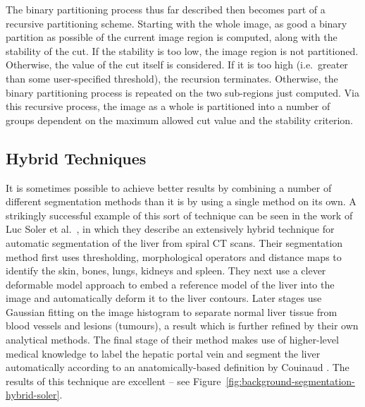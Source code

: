 The binary partitioning process thus far described then becomes part of a recursive partitioning scheme. Starting with the whole image, as good a binary partition as possible of the current image region is computed, along with the stability of the cut. If the stability is too low, the image region is not partitioned. Otherwise, the value of the cut itself is considered. If it is too high (i.e.~greater than some user-specified threshold), the recursion terminates. Otherwise, the binary partitioning process is repeated on the two sub-regions just computed. Via this recursive process, the image as a whole is partitioned into a number of groups dependent on the maximum allowed cut value and the stability criterion.


\subsection{Hybrid Techniques}


It is sometimes possible to achieve better results by combining a number of different segmentation methods than it is by using a single method on its own. A strikingly successful example of this sort of technique can be seen in the work of Luc Soler et al.\ \cite{soler01}, in which they describe an extensively hybrid technique for automatic segmentation of the liver from spiral CT scans. Their segmentation method first uses thresholding, morphological operators and distance maps to identify the skin, bones, lungs, kidneys and spleen. They next use a clever deformable model approach to embed a reference model of the liver into the image and automatically deform it to the liver contours. Later stages use Gaussian fitting on the image histogram to separate normal liver tissue from blood vessels and lesions (tumours), a result which is further refined by their own analytical methods. The final stage of their method makes use of higher-level medical knowledge to label the hepatic portal vein and segment the liver automatically according to an anatomically-based definition by Couinaud \cite{couinaud57}. The results of this technique are excellent -- see Figure~\ref{fig:background-segmentation-hybrid-soler}.


